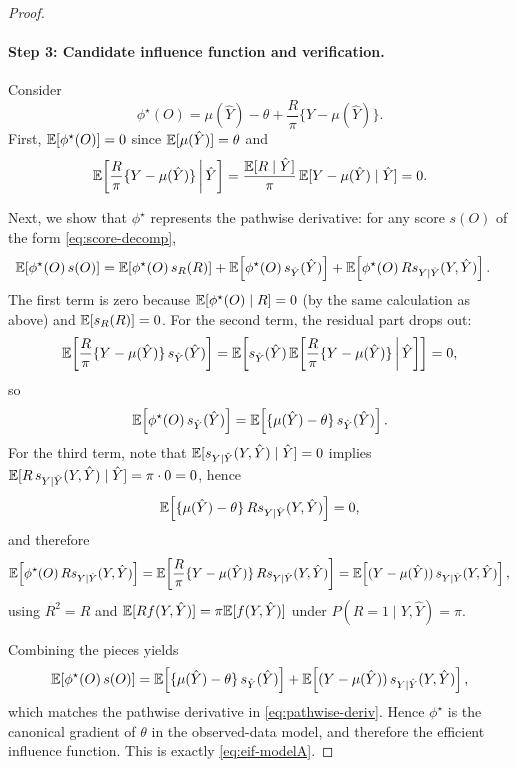 \begin{proof}
\paragraph{Step 3: Candidate influence function and verification.}
Consider
\begin{equation}
\label{eq:eif-cand}
\phi^\star(O)
=
\mu(\hat Y)-\theta+\frac{R}{\pi}\{Y-\mu(\hat Y)\}.
\end{equation}
First, $\mathbb{E}[\phi^\star(O)]=0$ since $\mathbb{E}[\mu(\hat Y)]=\theta$ and
\[
\mathbb{E}\!\left[\frac{R}{\pi}\{Y-\mu(\hat Y)\}\,\middle|\,\hat Y\right]
=
\frac{\mathbb{E}[R\mid \hat Y]}{\pi}\,\mathbb{E}[Y-\mu(\hat Y)\mid \hat Y]
=0.
\]

Next, we show that $\phi^\star$ represents the pathwise derivative: for any score $s(O)$ of the form
\eqref{eq:score-decomp},
\begin{align*}
\mathbb{E}\!\left[\phi^\star(O)\,s(O)\right]
&=
\mathbb{E}\!\left[\phi^\star(O)\,s_R(R)\right]
+\mathbb{E}\!\left[\phi^\star(O)\,s_{\hat Y}(\hat Y)\right]
+\mathbb{E}\!\left[\phi^\star(O)\,R s_{Y\mid \hat Y}(Y,\hat Y)\right].
\end{align*}
The first term is zero because $\mathbb{E}[\phi^\star(O)\mid R]=0$ (by the same calculation as above) and $\mathbb{E}[s_R(R)]=0$.
For the second term, the residual part drops out:
\[
\mathbb{E}\!\left[\frac{R}{\pi}\{Y-\mu(\hat Y)\}\,s_{\hat Y}(\hat Y)\right]
=
\mathbb{E}\!\left[
s_{\hat Y}(\hat Y)\,
\mathbb{E}\!\left[\frac{R}{\pi}\{Y-\mu(\hat Y)\}\,\middle|\,\hat Y\right]\right]
=0,
\]
so
\[
\mathbb{E}\!\left[\phi^\star(O)\,s_{\hat Y}(\hat Y)\right]
=
\mathbb{E}\!\left[\{\mu(\hat Y)-\theta\}\,s_{\hat Y}(\hat Y)\right].
\]
For the third term, note that $\mathbb{E}[s_{Y\mid \hat Y}(Y,\hat Y)\mid \hat Y]=0$ implies
$\mathbb{E}[R\,s_{Y\mid \hat Y}(Y,\hat Y)\mid \hat Y]=\pi\cdot 0=0$, hence
\[
\mathbb{E}\!\left[\{\mu(\hat Y)-\theta\}\,R s_{Y\mid \hat Y}(Y,\hat Y)\right]=0,
\]
and therefore
\[
\mathbb{E}\!\left[\phi^\star(O)\,R s_{Y\mid \hat Y}(Y,\hat Y)\right]
=
\mathbb{E}\!\left[\frac{R}{\pi}\{Y-\mu(\hat Y)\}\,R s_{Y\mid \hat Y}(Y,\hat Y)\right]
=
\mathbb{E}\!\left[(Y-\mu(\hat Y))\,s_{Y\mid \hat Y}(Y,\hat Y)\right],
\]
using $R^2=R$ and $\mathbb{E}[R f(Y,\hat Y)] = \pi \mathbb{E}[f(Y,\hat Y)]$ under $P(R=1\mid Y,\hat Y)=\pi$.

Combining the pieces yields
\[
\mathbb{E}\!\left[\phi^\star(O)\,s(O)\right]
=
\mathbb{E}\!\left[\{\mu(\hat Y)-\theta\}\,s_{\hat Y}(\hat Y)\right]
+
\mathbb{E}\!\left[(Y-\mu(\hat Y))\,s_{Y\mid \hat Y}(Y,\hat Y)\right],
\]
which matches the pathwise derivative in \eqref{eq:pathwise-deriv}. Hence $\phi^\star$ is the canonical gradient of $\theta$
in the observed-data model, and therefore the efficient influence function. This is exactly \eqref{eq:eif-modelA}.
\end{proof}

